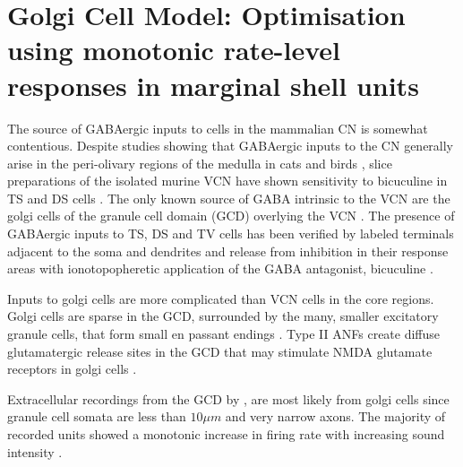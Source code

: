 

\graphicspath{{/media/data/Work/cnstellate/golgi_RateLevel/}{/media/data/Work/Responses/}{/media/data/Work/cnstellate/Responses/}}

\section[Golgi Cell Model]{Golgi Cell Model: Optimisation using
  monotonic rate-level responses in marginal shell units}
\label{sec:golgi-cell-model}


The source of GABAergic inputs to cells in the mammalian CN is somewhat
contentious. Despite studies showing that GABAergic inputs to the CN generally
arise in the peri-olivary regions of the medulla in cats
\citep{OstapoffBensonEtAl:1997} and birds
\citep{LachicaRubsamenEtAl:1995,YangMonsivaisEtAl:1999}, slice preparations of
the isolated murine VCN have shown sensitivity to bicuculine in TS and DS cells
\citep{FerragamoGoldingEtAl:1998a}.  The only known source of GABA intrinsic
to the VCN are the golgi cells of the granule cell domain (GCD) overlying the
VCN
\citep[Fig.~\ref{fig:CNdiagram}]{Mugnaini:1985,FerragamoGoldingEtAl:1998}. The
presence of GABAergic inputs to TS, DS and TV cells has been verified by
labeled terminals adjacent to the soma and dendrites
\citep{SmithRhode:1989,AwatramaniTurecekEtAl:2005,BabalianRyugoEtAl:2003} and
release from inhibition in their response areas with ionotopopheretic
application of the GABA antagonist, bicuculine
\citep{EvansZhao:1998,CasparyBackoffEtAl:1994,BackoffShadduckEtAl:1999,FerragamoGoldingEtAl:1998a}.


Inputs to golgi cells are more complicated than VCN cells in the core regions. Golgi
cells are sparse in the GCD, surrounded by the many, smaller excitatory
granule cells, that form small en passant endings . Type II ANFs create diffuse glutamatergic release sites
in the GCD \citep{HurdHutsonEtAl:1999,BensonBrown:2004} that may
stimulate NMDA glutamate receptors in golgi cells \citep{FerragamoGoldingEtAl:1998a}. 



Extracellular recordings from the GCD by \citet{GhoshalKim:1997}, are most likely from golgi
cells since granule cell somata are less than  $10 \mu m$ and very
narrow axons. The majority of recorded
units showed a monotonic increase in firing rate with increasing sound
intensity \citep{GhoshalKim:1997}. 


